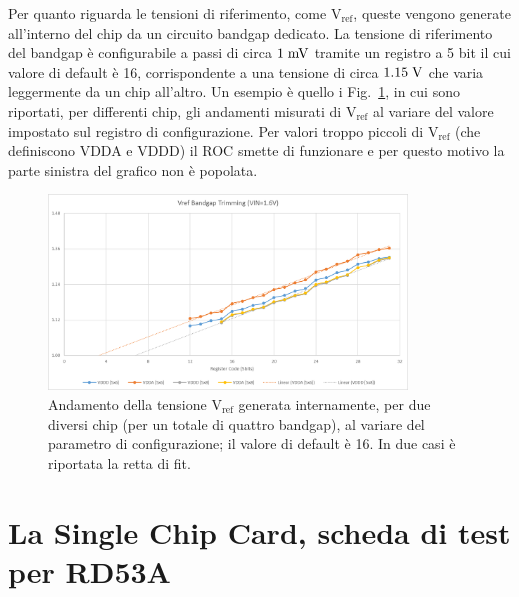 Per quanto riguarda le tensioni di riferimento, come $\mathrm{V_{ref}}$, queste vengono generate all'interno del chip da un circuito bandgap dedicato.
La tensione di riferimento del bandgap è configurabile a passi di circa $1\rm \; mV$ tramite un registro a 5 bit il cui valore di default \`e 16, corrispondente a una tensione di circa $1.15\rm \; V$ che varia leggermente da un chip all'altro.
Un esempio è quello i Fig.~\ref{bandgap_trimming}, in cui sono riportati, per differenti chip, gli andamenti misurati di $\mathrm{V_{ref}}$ al variare del valore impostato sul registro di configurazione. Per valori troppo piccoli di $\mathrm{V_{ref}}$ (che definiscono VDDA e VDDD) il ROC smette di funzionare e per questo motivo la parte sinistra del grafico non \`e popolata.
\begin{figure}
\centering
\includegraphics[width=0.85\textwidth]{Immagini/bandgap_trimming}
\caption{Andamento della tensione $\mathrm{V_{ref}}$ generata internamente, per due diversi chip (per un totale di quattro bandgap), al variare del parametro di configurazione; il valore di default è 16. In due casi \`e riportata la retta di fit.}
\label{bandgap_trimming}
\end{figure}

\section{La Single Chip Card, scheda di test per RD53A}

